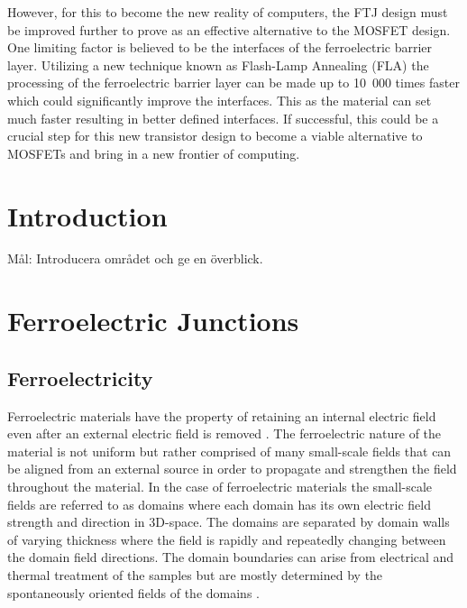 \documentclass[11pt,twoside]{eitExjobb}
\begin{document}
However, for this to become the new reality of computers, the FTJ design must be
improved further to prove as an effective alternative to the MOSFET design. One
limiting factor is believed to be the interfaces of the ferroelectric barrier
layer. Utilizing a new technique known as Flash-Lamp Annealing (FLA) the
processing of the ferroelectric barrier layer can be made up to 10 000 times
faster which could significantly improve the interfaces. This as the material
can set much faster resulting in better defined interfaces. If successful, this
could be a crucial step for this new transistor design to become a viable
alternative to MOSFETs and bring in a new frontier of computing.

\tableofcontents
\listoffigures
\listoftables
\cleardoublepage{}
\mainmatter{}
\chapter{Introduction}\label{ch:intro}

Mål: Introducera området och ge en överblick.\cite{athle2019development}
    
\chapter{Ferroelectric Junctions}\label{ch:ferro}


\section{Ferroelectricity}\label{sec:ferro}


Ferroelectric materials have the property of retaining an internal electric
field even after an external electric field is removed
\cite{dawber2005physics}. The ferroelectric nature of the material is not
uniform but rather comprised of many small-scale fields that can be aligned
from an external source in order to propagate and strengthen the field
throughout the material. In the case of ferroelectric materials the small-scale
fields are referred to as domains where each domain has its own electric field
strength and direction in 3D-space. The domains are separated by domain walls
of varying thickness where the field is rapidly and repeatedly changing between
the domain field directions. The domain boundaries can arise from electrical
and thermal treatment of the samples but are mostly determined by the
spontaneously oriented fields of the domains \cite{damjanovic2006hysteresis}.
\end{document}
